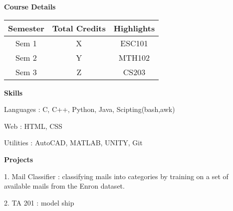 \documentclass[12pt]{article}
\begin{document}
\begin{flushleft}
\begin{tabular}{ |c|c|c|c| }
\hline

\end{tabular}

\bigskip

\textbf{\Large Course Details}

\bigskip

\begin{tabular}{ |c|c|c| }

\hline

Semester & {\hspace{1mm}} Total Credits {\hspace{1mm}} & {\hspace{1mm}} Highlights {\hspace{1mm}} \\ \hline

Sem 1 & {\hspace{1mm}} X {\hspace{1mm}} & {\hspace{1mm}} ESC101 {\hspace{1mm}} \\ \hline

Sem 2 & {\hspace{1mm}} Y {\hspace{1mm}} & {\hspace{1mm}} MTH102 {\hspace{1mm}} \\ \hline

Sem 3 & {\hspace{1mm}} Z {\hspace{1mm}} & {\hspace{1mm}} CS203 {\hspace{1mm}} \\ \hline

\end{tabular}

\bigskip

\textbf{\Large Skills}

Languages : C, C++, Python, Java, Scipting(bash,awk)

Web : HTML, CSS

Utilities : AutoCAD, MATLAB, UNITY, Git

\bigskip

\textbf{\Large Projects}

\bigskip

1. Mail Classifier : classifying mails into categories by training on a set of available mails from the Enron dataset.

2. TA 201 : model ship


\end{flushleft}
\end{document}
